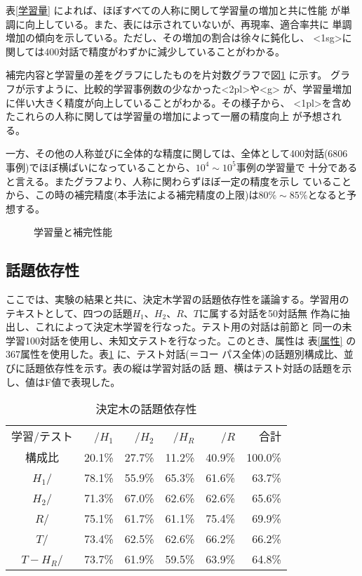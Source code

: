 表\ref{学習量} によれば、ほぼすべての人称に関して学習量の増加と共に性能
が単調に向上している。また、表には示されていないが、再現率、適合率共に
単調増加の傾向を示している。ただし、その増加の割合は徐々に鈍化し、
<1sg>に関しては400対話で精度がわずかに減少していることがわかる。

補完内容と学習量の差をグラフにしたものを片対数グラフで図\ref{図:学習量} に示す。
グラフが示すように、比較的学習事例数の少なかった<2pl>や<g>
が、学習量増加に伴い大きく精度が向上していることがわかる。その様子から、
<1pl>を含めたこれらの人称に関しては学習量の増加によって一層の精度向上
が予想される。

一方、その他の人称並びに全体的な精度に関しては、全体として400対話(6806
事例)でほぼ横ばいになっていることから、$10^4 \sim 10^5$事例の学習量で
十分であると言える。またグラフより、人称に関わらずほぼ一定の精度を示し
ていることから、この時の補完精度(本手法による補完精度の上限)は$80\%
\sim 85\%$となると予想する。


\begin{figure}
\vspace{-6mm}
\begin{center}
\caption{学習量と補完性能}
\label{図:学習量}
\end{center}
\end{figure}



\subsection{話題依存性}
\label{節:話題依存性}

ここでは、実験の結果と共に、決定木学習の話題依存性を議論する。学習用の
テキストとして、四つの話題$H_1$、$H_2$、$R$、$T$に属する対話を50対話無
作為に抽出し、これによって決定木学習を行なった。テスト用の対話は前節と
同一の未学習100対話を使用し、未知文テストを行なった。このとき、属性は
表\ref{属性} の367属性を使用した。表\ref{話題依存性} に、テスト対話(＝コー
パス全体)の話題別構成比、並びに話題依存性を示す。表の縦は学習対話の話
題、横はテスト対話の話題を示し、値はF値で表現した。

\begin{table}
\begin{center}
\caption{決定木の話題依存性}
\label{話題依存性}
\begin{tabular}{c|*{4}{r}|r}
\hline\hline
学習/テスト & /$H_1$ \hfil & /$H_2$ \hfil & /$H_R$ \hfil & /$R$ \hfil & 合計 \\
構成比 & 20.1\% & 27.7\% & 11.2\% & 40.9\% & 100.0\% \\
\hline
$H_1$/ & 78.1\% & 55.9\% & 65.3\% & 61.6\% & 63.7\% \\
$H_2$/ & 71.3\% & 67.0\% & 62.6\% & 62.6\% & 65.6\% \\
$R$/   & 75.1\% & 61.7\% & 61.1\% & 75.4\% & 69.9\% \\
$T$/   & 73.4\% & 62.5\% & 62.6\% & 66.2\% & 66.2\% \\
\hline
$T-H_R$/&73.7\% & 61.9\% & 59.5\% & 63.9\% & 64.8\% \\
\hline
\end{tabular}
\end{center}
\end{table}

